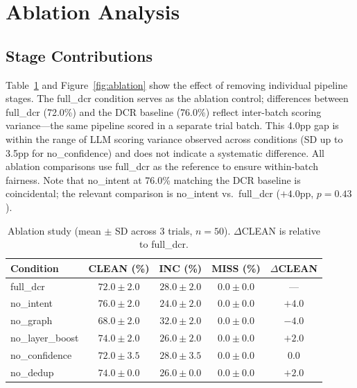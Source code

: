 \documentclass[11pt,a4paper]{article}
\begin{document}
\section{Ablation Analysis}
\label{sec:ablation}

\subsection{Stage Contributions}

Table~\ref{tab:ablation} and Figure~\ref{fig:ablation} show the effect of removing individual pipeline stages. The full\_dcr condition serves as the ablation control; differences between full\_dcr (72.0\%) and the DCR baseline (76.0\%) reflect inter-batch scoring variance---the same pipeline scored in a separate trial batch. This 4.0pp gap is within the range of LLM scoring variance observed across conditions (SD up to 3.5pp for no\_confidence) and does not indicate a systematic difference. All ablation comparisons use full\_dcr as the reference to ensure within-batch fairness. Note that no\_intent at 76.0\% matching the DCR baseline is coincidental; the relevant comparison is no\_intent vs.\ full\_dcr ($+4.0$pp, $p = 0.43$).

\begin{table}[t]
\centering
\caption{Ablation study (mean $\pm$ SD across 3 trials, $n = 50$). $\Delta$CLEAN is relative to full\_dcr.}
\label{tab:ablation}
\begin{tabular}{@{}lcccc@{}}
\toprule
Condition & CLEAN (\%) & INC (\%) & MISS (\%) & $\Delta$CLEAN \\
\midrule
full\_dcr & $72.0 \pm 2.0$ & $28.0 \pm 2.0$ & $0.0 \pm 0.0$ & --- \\
\addlinespace
no\_intent & $76.0 \pm 2.0$ & $24.0 \pm 2.0$ & $0.0 \pm 0.0$ & $+4.0$ \\
no\_graph & $68.0 \pm 2.0$ & $32.0 \pm 2.0$ & $0.0 \pm 0.0$ & $-4.0$ \\
no\_layer\_boost & $74.0 \pm 2.0$ & $26.0 \pm 2.0$ & $0.0 \pm 0.0$ & $+2.0$ \\
no\_confidence & $72.0 \pm 3.5$ & $28.0 \pm 3.5$ & $0.0 \pm 0.0$ & $0.0$ \\
no\_dedup & $74.0 \pm 0.0$ & $26.0 \pm 0.0$ & $0.0 \pm 0.0$ & $+2.0$ \\
\bottomrule
\end{tabular}
\end{table}
\end{document}
